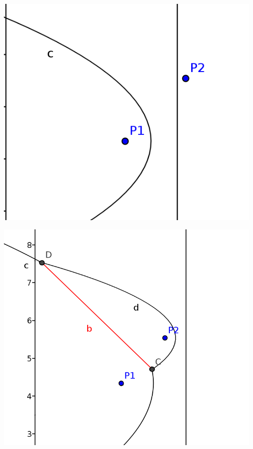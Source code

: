 \begin{minipage}[t]{0.5\textwidth}
    \includegraphics[width=\textwidth]{images/sweep_line_03.png}
\label{fig:delaunayExample018000}
\end{minipage}
\begin{minipage}[t]{0.5\textwidth}
    \includegraphics[width=\textwidth]{images/sweep_line_04.png}
\label{fig:delaunayExample018000}
\end{minipage}

